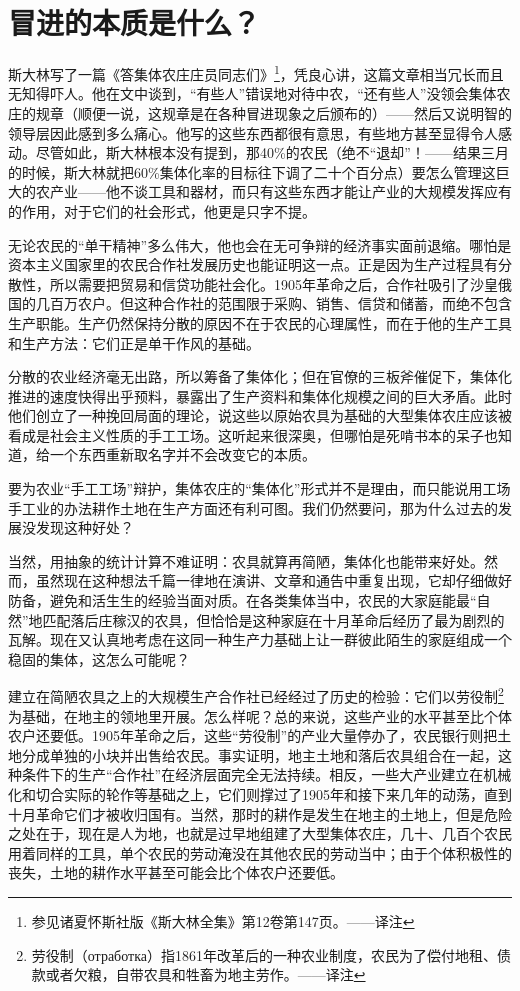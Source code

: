\documentclass[UTF8, 12pt, a4paper]{ctexrep}
\begin{document}
\section{冒进的本质是什么？}

斯大林写了一篇《答集体农庄庄员同志们》\footnote{参见诸夏怀斯社版《斯大林全集》第12卷第147页。——译注}，凭良心讲，这篇文章相当冗长而且无知得吓人。他在文中谈到，“有些人”错误地对待中农，“还有些人”没领会集体农庄的规章（顺便一说，这规章是在各种冒进现象之后颁布的）——然后又说明智的领导层因此感到多么痛心。他写的这些东西都很有意思，有些地方甚至显得令人感动。尽管如此，斯大林根本没有提到，那40\%的农民（绝不“退却”！——结果三月的时候，斯大林就把60\%集体化率的目标往下调了二十个百分点）要怎么管理这巨大的农产业——他不谈工具和器材，而只有这些东西才能让产业的大规模发挥应有的作用，对于它们的社会形式，他更是只字不提。

无论农民的“单干精神”多么伟大，他也会在无可争辩的经济事实面前退缩。哪怕是资本主义国家里的农民合作社发展历史也能证明这一点。正是因为生产过程具有分散性，所以需要把贸易和信贷功能社会化。1905年革命之后，合作社吸引了沙皇俄国的几百万农户。但这种合作社的范围限于采购、销售、信贷和储蓄，而绝不包含生产职能。生产仍然保持分散的原因不在于农民的心理属性，而在于他的生产工具和生产方法：它们正是单干作风的基础。

分散的农业经济毫无出路，所以筹备了集体化；但在官僚的三板斧催促下，集体化推进的速度快得出乎预料，暴露出了生产资料和集体化规模之间的巨大矛盾。此时他们创立了一种挽回局面的理论，说这些以原始农具为基础的大型集体农庄应该被看成是社会主义性质的手工工场。这听起来很深奥，但哪怕是死啃书本的呆子也知道，给一个东西重新取名字并不会改变它的本质。

要为农业“手工工场”辩护，集体农庄的“集体化”形式并不是理由，而只能说用工场手工业的办法耕作土地在生产方面还有利可图。我们仍然要问，那为什么过去的发展没发现这种好处？

当然，用抽象的统计计算不难证明：农具就算再简陋，集体化也能带来好处。然而，虽然现在这种想法千篇一律地在演讲、文章和通告中重复出现，它却仔细做好防备，避免和活生生的经验当面对质。在各类集体当中，农民的大家庭能最“自然”地匹配落后庄稼汉的农具，但恰恰是这种家庭在十月革命后经历了最为剧烈的瓦解。现在又认真地考虑在这同一种生产力基础上让一群彼此陌生的家庭组成一个稳固的集体，这怎么可能呢？

建立在简陋农具之上的大规模生产合作社已经经过了历史的检验：它们以劳役制\footnote{劳役制（отработка）指1861年改革后的一种农业制度，农民为了偿付地租、债款或者欠粮，自带农具和牲畜为地主劳作。——译注}为基础，在地主的领地里开展。怎么样呢？总的来说，这些产业的水平甚至比个体农户还要低。1905年革命之后，这些“劳役制”的产业大量停办了，农民银行则把土地分成单独的小块并出售给农民。事实证明，地主土地和落后农具组合在一起，这种条件下的生产“合作社”在经济层面完全无法持续。相反，一些大产业建立在机械化和切合实际的轮作等基础之上，它们则撑过了1905年和接下来几年的动荡，直到十月革命它们才被收归国有。当然，那时的耕作是发生在地主的土地上，但是危险之处在于，现在是人为地，也就是过早地组建了大型集体农庄，几十、几百个农民用着同样的工具，单个农民的劳动淹没在其他农民的劳动当中；由于个体积极性的丧失，土地的耕作水平甚至可能会比个体农户还要低。
\end{document}
